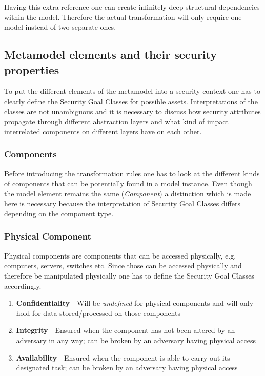 Having this extra reference one can create infinitely deep structural dependencies within the model. Therefore the actual transformation will only require one model instead of two separate ones.

\subsection{Metamodel elements and their security properties}
To put the different elements of the metamodel into a security context one has to clearly define the Security Goal Classes for possible assets. Interpretations of the classes are not unambiguous and it is necessary to discuss how security attributes propagate through different abstraction layers and what kind of impact interrelated components on different layers have on each other. 

\subsubsection{Components}

Before introducing the transformation rules one has to look at the different kinds of components that can be potentially found in a model instance. Even though the model element remains the same (\textit{Component}) a distinction which is made here is necessary because the interpretation of Security Goal Classes differs depending on the component type. 

\subsubsection*{Physical Component}

Physical components are components that can be accessed physically, e.g. computers, servers, switches etc. Since those can be accessed physically and therefore be manipulated physically one has to define the Security Goal Classes accordingly.

\begin{enumerate}
\item \textbf{Confidentiality} - Will be \textit{undefined} for physical components and will only hold for data stored/processed on those components
\item \textbf{Integrity} - Ensured when the component has not been altered by an adversary in any way; can be broken by an adversary having physical access
\item \textbf{Availability} - Ensured when the component is able to carry out its designated task; can be broken by an adversary having physical access
\end{enumerate}

